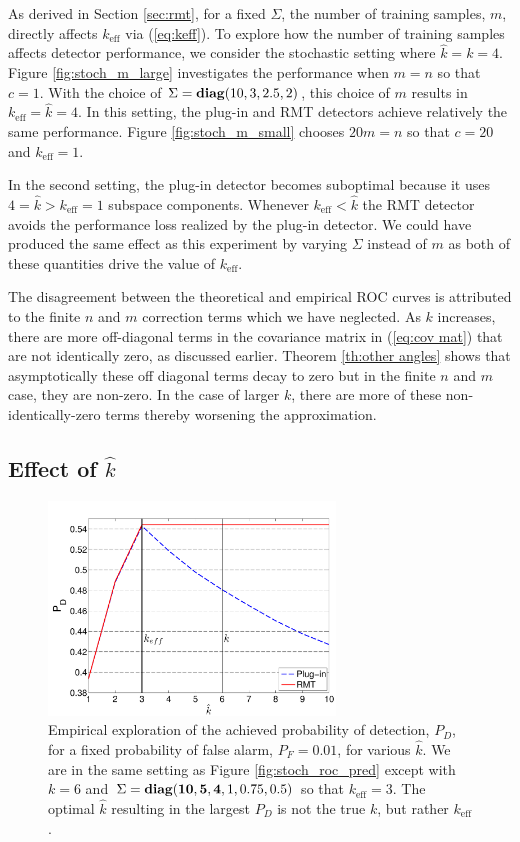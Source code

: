 As derived in Section \ref{sec:rmt}, for a fixed $\Sigma$, the number of training samples, $m$, directly affects $k_\text{eff}$ via (\ref{eq:keff}). To explore how the number of training samples affects detector performance, we consider the stochastic setting where $\widehat{k}=k=4$. Figure \ref{fig:stoch_m_large} investigates the performance when $m=n$ so that $c=1$. With the choice of $\Sigma=\mathop{\bf diag}(10,3,2.5,2)$, this choice of $m$ results in $k_\text{eff}=\widehat{k}=4$. In this setting, the plug-in and RMT detectors achieve relatively the same performance. Figure \ref{fig:stoch_m_small} chooses $20m=n$ so that $c=20$ and $k_\text{eff}=1$.

In the second setting, the plug-in detector becomes suboptimal because it uses $4=\widehat{k} > k_\text{eff}=1$ subspace components. Whenever $k_\text{eff}<\widehat{k}$ the RMT detector avoids the performance loss realized by the plug-in detector. We could have produced the same effect as this experiment by varying $\Sigma$ instead of $m$ as both of these quantities drive the value of $k_\text{eff}$.

The disagreement between the theoretical and empirical ROC curves is attributed to the finite $n$ and $m$ correction terms which we have neglected. As $k$ increases, there are more off-diagonal terms in the covariance matrix in (\ref{eq:cov mat}) that are not identically zero, as discussed earlier. Theorem \ref{th:other angles} shows that asymptotically these off diagonal terms decay to zero but in the finite $n$ and $m$ case, they are non-zero. In the case of larger $k$, there are more of these non-identically-zero terms thereby worsening the approximation.

\subsection{Effect of $\widehat{k}$}
\begin{figure}
\centering
\includegraphics[width=3in]{figures/stoch_khat.pdf}
\caption{Empirical exploration of the achieved probability of detection, $P_D$, for a fixed probability of false alarm, $P_F=0.01$, for various $\widehat{k}$. We are in the same setting as Figure \ref{fig:stoch_roc_pred} except with $k=6$ and $\Sigma = \mathop{\bf diag}({\bf{10,5,4}},1,0.75,0.5)$ so that $k_{\text{eff}}=3$. The optimal $\widehat{k}$ resulting in the largest $P_D$ is not the true $k$, but rather $k_\text{eff}$.}
\label{fig:stoch_khat}
\end{figure}

